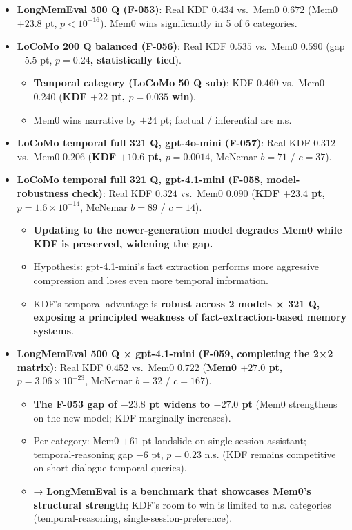 \begin{itemize}
\tightlist
\item
  \textbf{LongMemEval 500 Q (F-053)}: Real KDF \(0.434\) vs.~Mem0 \(0.672\) (Mem0 \(+23.8\) pt, \(p < 10^{-16}\)). Mem0 wins significantly in 5 of 6 categories.
\item
  \textbf{LoCoMo 200 Q balanced (F-056)}: Real KDF \(0.535\) vs.~Mem0 \(0.590\) (gap \(-5.5\) pt, \textbf{\(p = 0.24\), statistically tied}).

  \begin{itemize}
  \tightlist
  \item
    \textbf{Temporal category (LoCoMo 50 Q sub)}: KDF \(0.460\) vs.~Mem0 \(0.240\) (\textbf{KDF \(+22\) pt, \(p = 0.035\) win}).
  \item
    Mem0 wins narrative by \(+24\) pt; factual / inferential are n.s.
  \end{itemize}
\item
  \textbf{LoCoMo temporal full 321 Q, gpt-4o-mini (F-057)}: Real KDF \(0.312\) vs.~Mem0 \(0.206\) (\textbf{KDF \(+10.6\) pt, \(p = 0.0014\)}, McNemar \(b = 71\) / \(c = 37\)).
\item
  \textbf{LoCoMo temporal full 321 Q, gpt-4.1-mini (F-058, model-robustness check)}: Real KDF \(0.324\) vs.~Mem0 \(0.090\) (\textbf{KDF \(+23.4\) pt, \(p = 1.6 \times 10^{-14}\)}, McNemar \(b = 89\) / \(c = 14\)).

  \begin{itemize}
  \tightlist
  \item
    \textbf{Updating to the newer-generation model degrades Mem0 while KDF is preserved, widening the gap.}
  \item
    Hypothesis: gpt-4.1-mini's fact extraction performs more aggressive compression and loses even more temporal information.
  \item
    KDF's temporal advantage is \textbf{robust across 2 models × 321 Q, exposing a principled weakness of fact-extraction-based memory systems}.
  \end{itemize}
\item
  \textbf{LongMemEval 500 Q × gpt-4.1-mini (F-059, completing the 2×2 matrix)}: Real KDF \(0.452\) vs.~Mem0 \(0.722\) (\textbf{Mem0 \(+27.0\) pt, \(p = 3.06 \times 10^{-23}\)}, McNemar \(b = 32\) / \(c = 167\)).

  \begin{itemize}
  \tightlist
  \item
    \textbf{The F-053 gap of \(-23.8\) pt widens to \(-27.0\) pt} (Mem0 strengthens on the new model; KDF marginally increases).
  \item
    Per-category: Mem0 \(+61\)-pt landslide on single-session-assistant; temporal-reasoning gap \(-6\) pt, \(p = 0.23\) n.s. (KDF remains competitive on short-dialogue temporal queries).
  \item
    → \textbf{LongMemEval is a benchmark that showcases Mem0's structural strength}; KDF's room to win is limited to n.s. categories (temporal-reasoning, single-session-preference).
  \end{itemize}
\end{itemize}

